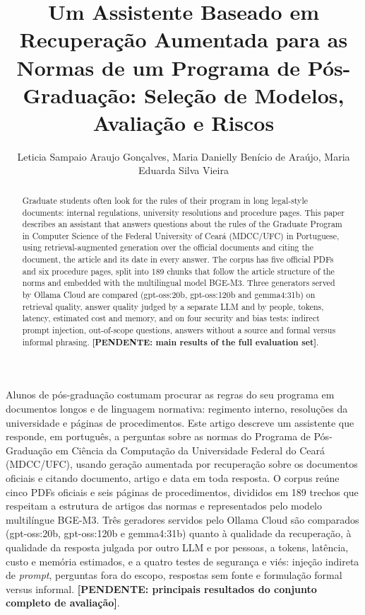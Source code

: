 \documentclass{sbc-template}
\title{Um Assistente Baseado em Recuperação Aumentada para as Normas de um
       Programa de Pós-Graduação: Seleção de Modelos, Avaliação e Riscos}
\author{Leticia Sampaio Araujo Gonçalves\inst{1}, Maria Danielly Benício de Araújo\inst{1},
        Maria Eduarda Silva Vieira\inst{1}}
\newcommand{\pendente}[1]{\textbf{[PENDENTE: #1]}}
\begin{document}
\maketitle

\begin{abstract}
Graduate students often look for the rules of their program in long legal-style
documents: internal regulations, university resolutions and procedure pages.
This paper describes an assistant that answers questions about the rules of the
Graduate Program in Computer Science of the Federal University of Ceará (MDCC/UFC)
in Portuguese, using retrieval-augmented generation over the official documents and
citing the document, the article and its date in every answer. The corpus has five
official PDFs and six procedure pages, split into 189 chunks that follow the article
structure of the norms and embedded with the multilingual model BGE-M3. Three
generators served by Ollama Cloud are compared (gpt-oss:20b, gpt-oss:120b and
gemma4:31b) on retrieval quality, answer quality judged by a separate LLM and by
people, tokens, latency, estimated cost and memory, and on four security and bias
tests: indirect prompt injection, out-of-scope questions, answers without a source and
formal versus informal phrasing. \pendente{main results of the full evaluation set}.
\end{abstract}

\begin{resumo}
Alunos de pós-graduação costumam procurar as regras do seu programa em documentos
longos e de linguagem normativa: regimento interno, resoluções da universidade e
páginas de procedimentos. Este artigo descreve um assistente que responde, em
português, a perguntas sobre as normas do Programa de Pós-Graduação em Ciência da
Computação da Universidade Federal do Ceará (MDCC/UFC), usando geração aumentada por
recuperação sobre os documentos oficiais e citando documento, artigo e data em toda
resposta. O corpus reúne cinco PDFs oficiais e seis páginas de procedimentos,
divididos em 189 trechos que respeitam a estrutura de artigos das normas e
representados pelo modelo multilíngue BGE-M3. Três geradores servidos pelo Ollama
Cloud são comparados (gpt-oss:20b, gpt-oss:120b e gemma4:31b) quanto à qualidade da
recuperação, à qualidade da resposta julgada por outro LLM e por pessoas, a tokens,
latência, custo e memória estimados, e a quatro testes de segurança e viés: injeção
indireta de \textit{prompt}, perguntas fora do escopo, respostas sem fonte e
formulação formal versus informal. \pendente{principais resultados do conjunto
completo de avaliação}.
\end{resumo}
\end{document}
